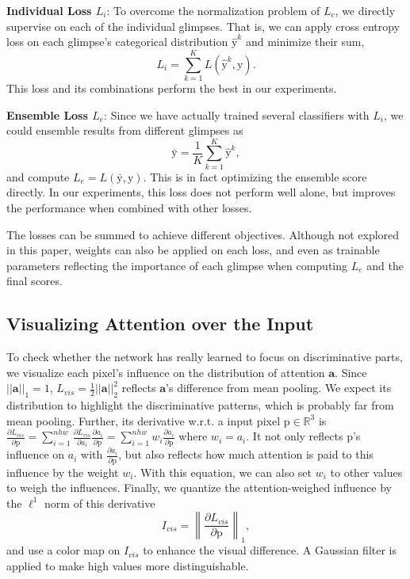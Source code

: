 \documentclass[runningheads]{llncs}
\def\a{\mathbf{a}}
\def\y{\boldsymbol{\mathrm{y}}}
\def\Re{\mathbb{R}}
\def\bp{\boldsymbol{\mathrm{p}}}
\begin{document}
\textbf{Individual Loss $L_i$}: To overcome the normalization problem of $L_c$, we directly supervise on each of the individual glimpses. That is, we can apply cross entropy loss on each glimpse's categorical distribution $\hat{\y}^k$ and minimize their sum,
\begin{equation}\label{eq:individual_loss}
L_i=\sum_{k=1}^{K} L(\hat{\y}^k, \y).
\end{equation}
This loss and its combinations perform the best in our experiments.

\textbf{Ensemble Loss $L_e$}: Since we have actually trained several classifiers with $L_i$, we could ensemble results from different glimpses as
\begin{equation}\label{eq:ensemble_score}
\bar{\y} = \frac{1}{K}\sum_{k=1}^{K}{\hat{\y}^k},
\end{equation}
and compute $L_e=L(\bar{\y},\y)$.
This is in fact optimizing the ensemble score directly. In our experiments, this loss does not perform well alone, but improves the performance when combined with other losses. 

The losses can be summed to achieve different objectives. Although not explored in this paper, weights can also be applied on each loss, and even as trainable parameters reflecting the importance of each glimpse when computing $L_e$ and the final scores.

\subsection{Visualizing Attention over the Input}\label{sec:visualize}
To check whether the network has really learned to focus on discriminative parts, we visualize each pixel's influence on the distribution of attention $\a$. Since $||\a||_1=1$, $L_{vis}=\frac{1}{2}||\a||_2^2$ reflects $\a$'s difference from mean pooling. We expect its distribution to highlight the discriminative patterns, which is probably far from mean pooling. Further, its derivative w.r.t. a input pixel $\bp\in \Re^3$ is $\frac{\partial L_{vis}}{\partial \bp} =\sum_{i=1}^{nhw} \frac{\partial L_{vis}}{\partial a_i}\frac{\partial a_i}{\partial \bp}=\sum_{i=1}^{nhw} w_i\frac{\partial a_i}{\partial \bp}$
where $w_i=a_i$. It not only reflects $\bp$'s influence on $a_i$ with $\frac{\partial a_i}{\partial \bp}$, but also reflects how much attention is paid to this influence by the weight $w_i$. With this equation, we can also set $w_i$ to other values to weigh the influences. Finally, we quantize the attention-weighed influence by the $\ell^1$ norm of this derivative
\begin{equation}\label{eq:l1}
I_{vis}=\left\lVert\frac{\partial L_{vis}}{\partial \bp}\right\lVert_1,
\end{equation}
and use a color map on $I_{vis}$ to enhance the visual difference. A Gaussian filter is applied to make high values more distinguishable.
\end{document}
